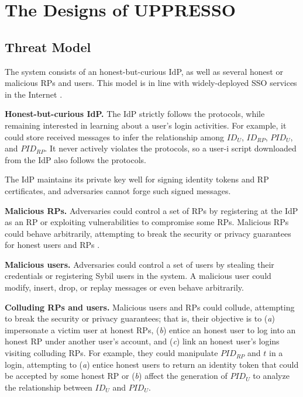 \section{The Designs of UPPRESSO}
\label{sec:UPPRESSO}


\subsection{Threat Model}
\label{subsec:threatmodel}
The system consists of an honest-but-curious IdP, as well as several honest or malicious RPs and users. This model is in line with widely-deployed SSO services in the Internet \cite{OpenIDConnect,rfc6749, SAML, SAMLIdentifier}.


\noindent \textbf{Honest-but-curious IdP.} The IdP strictly follows the protocols,
 while remaining interested in learning about a user's login activities.
For example, it could store received messages to infer the relationship among $ID_U$, $ID_{RP}$, $PID_{U}$, and $PID_{RP}$.
It never actively violates the protocols,
 so a user-i script downloaded from the IdP also follows the protocols.

The IdP maintains its private key well for signing identity tokens and RP certificates, %
and adversaries cannot forge such signed messages.

\noindent \textbf{Malicious RPs.}
Adversaries could control a set of RPs by registering at the IdP as an RP or exploiting vulnerabilities to compromise some RPs.
Malicious RPs could behave arbitrarily, attempting to break the security or privacy guarantees for honest users and RPs \cite{SPRESSO, FettKS14,POIDC,miso}.


\noindent \textbf{Malicious users.} Adversaries could control a set of users by stealing their credentials or registering Sybil users in the system.
A malicious user could modify, insert, drop, or replay messages or even behave arbitrarily.

\noindent \textbf{Colluding RPs and users.}
Malicious users and RPs could collude,
 attempting to break the security or privacy guarantees;
that is,
their objective is to (\emph{a}) impersonate a victim user at honest RPs, (\emph{b}) entice an honest user to log into an honest RP under another user's account,
 and (\emph{c}) link an honest user's logins visiting colluding RPs.
For example, they could manipulate $PID_{RP}$ and $t$ in a login, attempting to (\emph{a}) entice honest users to return an identity token that could be accepted by some honest RP or (\emph{b}) affect the generation of $PID_U$ to analyze the relationship between $ID_U$ and $PID_U$.





